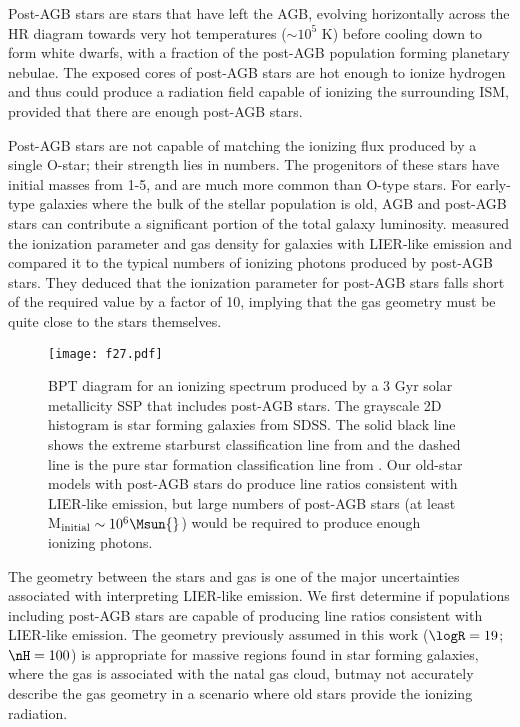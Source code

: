 Post-AGB stars are stars that have left the AGB, evolving horizontally across the HR diagram towards very hot temperatures ($\sim10^5$ K) before cooling down to form white dwarfs, with a fraction of the post-AGB population forming planetary nebulae. The exposed cores of post-AGB stars are hot enough to ionize hydrogen and thus could produce a radiation field capable of ionizing the surrounding ISM, provided that there are enough post-AGB stars. 

Post-AGB stars are not capable of matching the ionizing flux produced by a single O-star; their strength lies in numbers. The progenitors of these stars have initial masses from 1-5\Msun{}, and are much more common than O-type stars. For early-type galaxies where the bulk of the stellar population is old, AGB and post-AGB stars can contribute a significant portion of the total galaxy luminosity. \citet{Yan12} measured the ionization parameter and gas density for galaxies with LIER-like emission and compared it to the typical numbers of ionizing photons produced by post-AGB stars. They deduced that the ionization parameter for post-AGB stars falls short of the required value by a factor of 10, implying that the gas geometry must be quite close to the stars themselves.

\begin{figure}[!htbp]
  \begin{centering}
    \texttt{[image: f27.pdf]}
    \caption{BPT diagram for an ionizing spectrum produced by a 3 Gyr solar metallicity SSP that includes post-AGB stars. The grayscale 2D histogram is star forming galaxies from SDSS. The solid black line shows the extreme starburst classification line from \citet{Kewley01} and the dashed line is the pure star formation classification line from \citet{Kauffmann03a}. Our old-star models with post-AGB stars do produce line ratios consistent with LIER-like emission, but large numbers of post-AGB stars (at least M$_{\mathrm{initial}} \sim 10^6\Msun{}$) would be required to produce enough ionizing photons.}
    \label{fig:pAGBBPT}
  \end{centering}
\end{figure}

The geometry between the stars and gas is one of the major uncertainties associated with interpreting LIER-like emission. We first determine if populations including post-AGB stars are capable of producing line ratios consistent with LIER-like emission. The geometry previously assumed in this work ($\logR = 19$; $\nH = 100$) is appropriate for massive \hii regions found in star forming galaxies, where the gas is associated with the natal gas cloud, butmay not accurately describe the gas geometry in a scenario where old stars provide the ionizing radiation.

